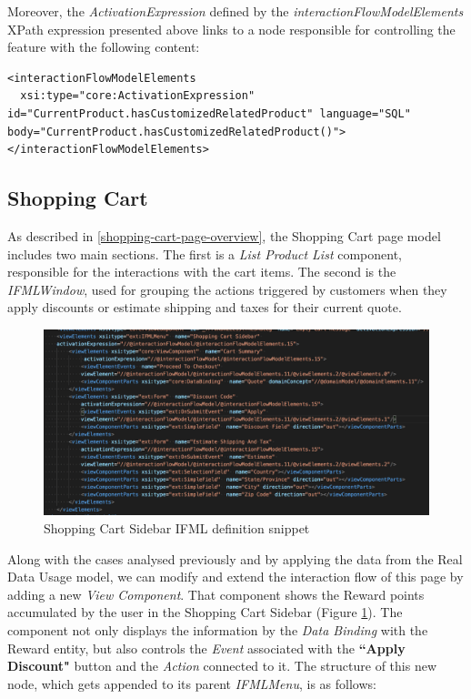 Moreover, the \textit{ActivationExpression} defined by the \textit{interactionFlowModelElements} XPath expression presented above links to a node responsible for controlling the feature with the following content:

\vspace{0.5cm}
\lstset{language=XML}
\begin{lstlisting} 
<interactionFlowModelElements 
  xsi:type="core:ActivationExpression" id="CurrentProduct.hasCustomizedRelatedProduct" language="SQL" body="CurrentProduct.hasCustomizedRelatedProduct()">
</interactionFlowModelElements>

\end{lstlisting}
\vspace{0.5cm}
\subsection{Shopping Cart}
\label{shopping-cart-updates}

As described in \ref{shopping-cart-page-overview}, the Shopping Cart page model includes two main sections. The first is a \textit{List Product List} component, responsible for the interactions with the cart items. The second is the \textit{IFMLWindow}, used for grouping the actions triggered by customers when they apply discounts or estimate shipping and taxes for their current quote.

\vspace{0.5cm}
\begin{figure}[H]
  \centering
    \includegraphics[width=12cm]{images/madison/ifml-shopping-cart-sidebar.png}
  \caption{Shopping Cart Sidebar IFML definition snippet}
  \label{fig:shopping-cart-sidebar-ifml-definition}
\end{figure}
\vspace{0.5cm}

Along with the cases analysed previously and by applying the data from the Real Data Usage model, we can modify and extend the interaction flow of this page by adding a new \textit{View Component}. That component shows the Reward points accumulated by the user in the Shopping Cart Sidebar (Figure \ref{fig:shopping-cart-sidebar-ifml-definition}). The component not only displays the information by the \textit{Data Binding} with the Reward entity, but also controls the \textit{Event} associated with the \textbf{``Apply Discount"} button and the \textit{Action} connected to it. 
The structure of this new node, which gets appended to its parent \textit{IFMLMenu}, is as follows:

